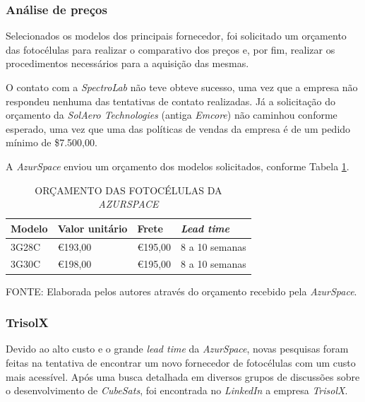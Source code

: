 \documentclass[
	12pt,				%
	openright,			%
	oneside,			%
	a4paper,			%
	english,			%
	french,				%
	spanish,			%
	brazil,				%
	oldfontcommands
	]{abntex2}
\begin{document}
\subsubsection[Análise de preços]{Análise de preços}

	Selecionados os modelos dos principais fornecedor, foi solicitado um orçamento das fotocélulas para realizar o comparativo dos preços e, por fim, realizar os procedimentos necessários para a aquisição das mesmas.
	
	O contato com a \textit{SpectroLab} não teve obteve sucesso, uma vez que a empresa não respondeu nenhuma das tentativas de contato realizadas. Já a solicitação do orçamento da \textit{SolAero Technologies} (antiga \textit{Emcore}) não caminhou conforme esperado, uma vez que uma das políticas de vendas da empresa é de um pedido mínimo de \$7.500,00.
	
	A \textit{AzurSpace} enviou um orçamento dos modelos solicitados, conforme Tabela \ref{Tab_Orc_Cell}.
	
	\begin{table}[th]
	\caption{ORÇAMENTO DAS FOTOCÉLULAS DA \textit{AZURSPACE}}
	\label{Tab_Orc_Cell}
	\centering
	\begin{tabular}{p{3.0cm}|p{3.0cm}|p{3.0cm}|p{3.0cm}}
		\textbf{Modelo} & \textbf{Valor unitário} & \textbf{Frete} & \textit{\textbf{Lead time}}\\
		\hline
		3G28C & \euro 193,00 & \euro 195,00 & 8 a 10 semanas\\
		3G30C & \euro 198,00 & \euro 195,00 & 8 a 10 semanas\\

	\end{tabular}
	
	\begin{small}
	\vspace{3pt}
		FONTE: Elaborada pelos autores através do orçamento recebido pela \textit{AzurSpace}.
	\end{small}
	\end{table}	
	
\subsubsection[TrisolX]{TrisolX}	
	
	Devido ao alto custo e o grande \textit{lead time} da \textit{AzurSpace}, novas pesquisas foram feitas na tentativa de encontrar um novo fornecedor de fotocélulas com um custo mais acessível. Após uma busca detalhada em diversos grupos de discussões sobre o desenvolvimento de \textit{CubeSats}, foi encontrada no \textit{LinkedIn} a empresa \textit{TrisolX}.
	
\end{document}
